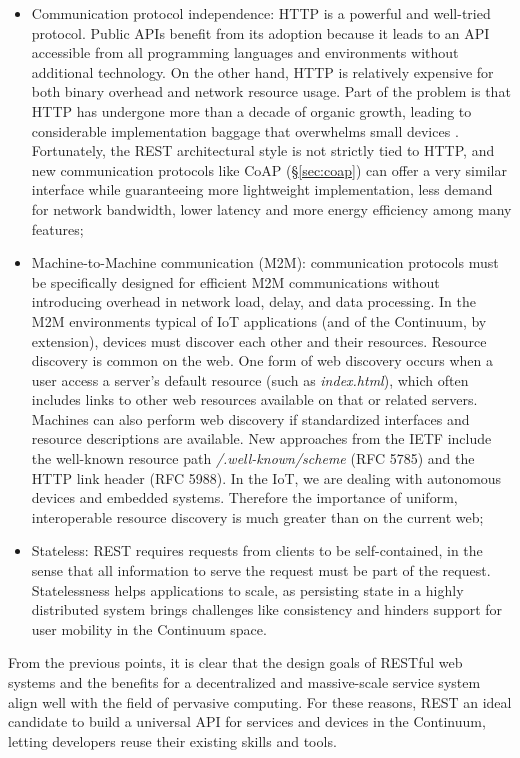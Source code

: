 \begin{itemize}
    \item Communication protocol independence: HTTP is a powerful and well-tried protocol. Public APIs benefit from its adoption because it leads to an API accessible from all programming languages and environments without additional technology. On the other hand, HTTP is relatively expensive for both binary overhead and network resource usage. Part of the problem is that HTTP has undergone more than a decade of organic growth, leading to considerable implementation baggage that overwhelms small devices \cite{bormann2012coap}. Fortunately, the REST architectural style is not strictly tied to HTTP, and new communication protocols like CoAP (§\ref{sec:coap}) can offer a very similar interface while guaranteeing more lightweight implementation, less demand for network bandwidth, lower latency and more energy efficiency among many features;
    \item Machine-to-Machine communication (M2M): communication protocols must be specifically designed for efficient M2M communications without introducing overhead in network load, delay, and data processing. In the M2M environments typical of IoT applications (and of the Continuum, by extension), devices must discover each other and their resources. Resource discovery is common on the web. One form of web discovery occurs when a user access a server's default resource (such as \emph{index.html}), which often includes links to other web resources available on that or related servers. Machines can also perform web discovery if standardized interfaces and resource descriptions are available. New approaches from the IETF include the well-known resource path \emph{/.well-known/scheme} (RFC 5785) and the HTTP link header (RFC 5988). In the IoT, we are dealing with autonomous devices and embedded systems. Therefore the importance of uniform, interoperable resource discovery is much greater than on the current web;
    \item Stateless: REST requires requests from clients to be self-contained, in the sense that all information to serve the request must be part of the request. Statelessness helps applications to scale, as persisting state in a highly distributed system brings challenges like consistency and hinders support for user mobility in the Continuum space.
\end{itemize}

From the previous points, it is clear that the design goals of RESTful web systems and the benefits for a decentralized and massive-scale service system align well with the field of pervasive computing. For these reasons, REST an ideal candidate to build a universal API for services and devices in the Continuum, letting developers reuse their existing skills and tools. 

